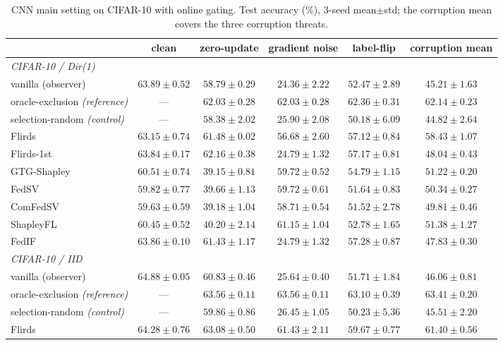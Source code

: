 \documentclass[letterpaper]{article} %
\theoremstyle{plain}
\begin{document}
\begin{table}[t]
\centering
\small
\caption{CNN main setting on CIFAR-10 with online gating. Test accuracy
(\%), 3-seed mean$\pm$std; the corruption mean covers the three corruption
threats.}
\label{tab:online}
\begin{tabular}{lccccc}
\hline
 & clean & zero-update & gradient noise & label-flip & corruption mean \\
\hline
\multicolumn{6}{l}{\emph{CIFAR-10 / Dir(1)}} \\
vanilla (observer) & $63.89\pm0.52$ & $58.79\pm0.29$ & $24.36\pm2.22$ & $52.47\pm2.89$ & $45.21\pm1.63$ \\
oracle-exclusion \emph{(reference)} & --- & $62.03\pm0.28$ & $62.03\pm0.28$ & $62.36\pm0.31$ & $62.14\pm0.23$ \\
selection-random \emph{(control)} & --- & $58.38\pm2.02$ & $25.90\pm2.08$ & $50.18\pm6.09$ & $44.82\pm2.64$ \\
Flirds & $63.15\pm0.74$ & $61.48\pm0.02$ & $56.68\pm2.60$ & $57.12\pm0.84$ & $58.43\pm1.07$ \\
Flirds-1st & $63.84\pm0.17$ & $62.16\pm0.38$ & $24.79\pm1.32$ & $57.17\pm0.81$ & $48.04\pm0.43$ \\
GTG-Shapley & $60.51\pm0.74$ & $39.15\pm0.81$ & $59.72\pm0.52$ & $54.79\pm1.15$ & $51.22\pm0.20$ \\
FedSV & $59.82\pm0.77$ & $39.66\pm1.13$ & $59.72\pm0.61$ & $51.64\pm0.83$ & $50.34\pm0.27$ \\
ComFedSV & $59.63\pm0.59$ & $39.18\pm1.04$ & $58.71\pm0.54$ & $51.52\pm2.78$ & $49.81\pm0.46$ \\
ShapleyFL & $60.45\pm0.52$ & $40.20\pm2.14$ & $61.15\pm1.04$ & $52.78\pm1.65$ & $51.38\pm1.27$ \\
FedIF & $63.86\pm0.10$ & $61.43\pm1.17$ & $24.79\pm1.32$ & $57.28\pm0.87$ & $47.83\pm0.30$ \\
\hline
\multicolumn{6}{l}{\emph{CIFAR-10 / IID}} \\
vanilla (observer) & $64.88\pm0.05$ & $60.83\pm0.46$ & $25.64\pm0.40$ & $51.71\pm1.84$ & $46.06\pm0.81$ \\
oracle-exclusion \emph{(reference)} & --- & $63.56\pm0.11$ & $63.56\pm0.11$ & $63.10\pm0.39$ & $63.41\pm0.20$ \\
selection-random \emph{(control)} & --- & $59.86\pm0.86$ & $26.45\pm1.05$ & $50.23\pm5.36$ & $45.51\pm2.20$ \\
Flirds & $64.28\pm0.76$ & $63.08\pm0.50$ & $61.43\pm2.11$ & $59.67\pm0.77$ & $61.40\pm0.56$ \\

\end{tabular}
\end{table}
\end{document}
